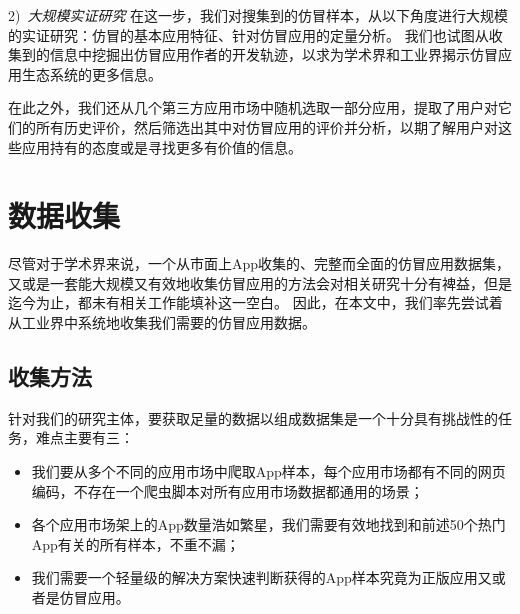 2)\ \emph{大规模实证研究} \quad
在这一步，我们对搜集到的仿冒样本，从以下角度进行大规模的实证研究：仿冒的基本应用特征、针对仿冒应用的定量分析。
我们也试图从收集到的信息中挖掘出仿冒应用作者的开发轨迹，以求为学术界和工业界揭示仿冒应用生态系统的更多信息。

在此之外，我们还从几个第三方应用市场中随机选取一部分应用，提取了用户对它们的所有历史评价，然后筛选出其中对仿冒应用的评价并分析，以期了解用户对这些应用持有的态度或是寻找更多有价值的信息。

\section{数据收集}
尽管对于学术界来说，一个从市面上App收集的、完整而全面的仿冒应用数据集，又或是一套能大规模又有效地收集仿冒应用的方法会对相关研究十分有裨益，但是迄今为止，都未有相关工作能填补这一空白。
因此，在本文中，我们率先尝试着从工业界中系统地收集我们需要的仿冒应用数据。

\subsection{收集方法}
针对我们的研究主体，要获取足量的数据以组成数据集是一个十分具有挑战性的任务，难点主要有三：
\begin{itemize}
	\item 我们要从多个不同的应用市场中爬取App样本，每个应用市场都有不同的网页编码，不存在一个爬虫脚本对所有应用市场数据都通用的场景；
	\item 各个应用市场架上的App数量浩如繁星，我们需要有效地找到和前述50个热门App有关的所有样本，不重不漏；
	\item 我们需要一个轻量级的解决方案快速判断获得的App样本究竟为正版应用又或者是仿冒应用。
\end{itemize}

